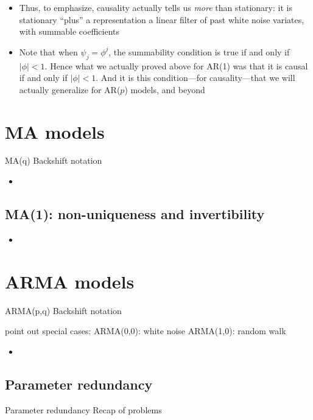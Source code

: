 \documentclass{article}
\begin{document}
\begin{itemize}
\item Thus, to emphasize, causality actually tells us \emph{more} than
  stationary: it is stationary ``plus'' a representation a linear filter of past
  white noise variates, with summable coefficients

\item Note that when $\psi_j = \phi^j$, the summability condition
   is true if and only if $|\phi| <
  1$. Hence what we actually proved above for AR(1) was that it is causal if and
  only if $|\phi| < 1$. And it is this condition---for causality---that we will
  actually generalize for AR($p$) models, and beyond 
\end{itemize}

\section{MA models}

MA(q)
Backshift notation 

\begin{itemize}
\item
\end{itemize}

\subsection{MA(1): non-uniqueness and invertibility}

\begin{itemize}
\item
\end{itemize}

\section{ARMA models}

ARMA(p,q)
Backshift notation

point out special cases: 
ARMA(0,0): white noise
ARMA(1,0): random walk 

\begin{itemize}
\item
\end{itemize}

\subsection{Parameter redundancy}

Parameter redundancy
Recap of problems
\end{document}
